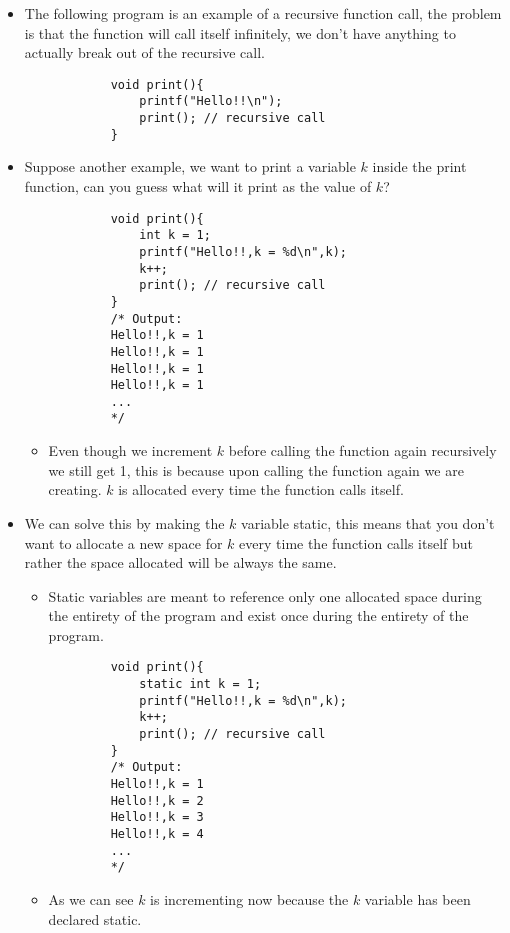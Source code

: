 \begin{itemize}
    \item The following program is an example of a recursive function call, the problem is that the function will call itself infinitely, we don't have anything to actually break out of the recursive call.
        \begin{verbatim}
            void print(){
                printf("Hello!!\n");
                print(); // recursive call
            }
        \end{verbatim}
    \item Suppose another example, we want to print a variable $k$ inside the print function, can you guess what will it print as the value of $k$? 
        \begin{verbatim}
            void print(){
                int k = 1;
                printf("Hello!!,k = %d\n",k);
                k++;
                print(); // recursive call
            }
            /* Output: 
            Hello!!,k = 1
            Hello!!,k = 1
            Hello!!,k = 1
            Hello!!,k = 1
            ...
            */ 
        \end{verbatim}
        \begin{itemize}
            \item Even though we increment $k$ before calling the function again recursively we still get 1, this is because upon calling the function again we are creating. $k$ is allocated every time the function calls itself.
        \end{itemize}
    
    \item We can solve this by making the $k$ variable static, this means that you don't want to allocate a new space for $k$ every time the function calls itself but rather the space allocated will be always the same.
        \begin{itemize}
            \item Static variables are meant to reference only one allocated space during the entirety of the program and exist once during the entirety of the program.
        \end{itemize}
        \begin{verbatim}
            void print(){
                static int k = 1;
                printf("Hello!!,k = %d\n",k);
                k++;
                print(); // recursive call
            }
            /* Output:
            Hello!!,k = 1
            Hello!!,k = 2
            Hello!!,k = 3
            Hello!!,k = 4
            ...
            */
        \end{verbatim}
        \begin{itemize}
            \item As we can see $k$  is incrementing now because the $k$ variable has been declared static. 
        \end{itemize}
    

\end{itemize}
